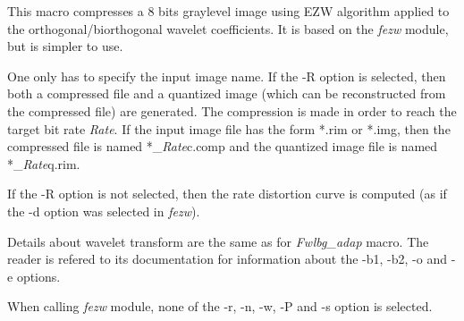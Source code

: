 This macro compresses a 8 bits graylevel image using EZW 
algorithm applied to the orthogonal/biorthogonal wavelet coefficients. 
It is based on the {\em fezw} module, but is simpler to use. 

One only has to specify the input image name. 
If the -R option is selected, then both a compressed file and a quantized 
image (which can be reconstructed from the compressed file) are generated. 
The compression is made in order to reach the target bit rate {\em Rate}. 
If the input image file has the form *.rim or *.img, then 
the compressed file is named *\_{\em Rate}c.comp and the quantized image file 
is named *\_{\em Rate}q.rim.

If the -R option is not selected, then the rate distortion curve is computed 
(as if the -d option was selected in {\em fezw}). 

Details about wavelet transform are the same as for {\em Fwlbg\_adap} macro. 
The reader is refered to its documentation for information about the -b1, -b2, 
-o and -e options. 


When calling {\em fezw} module, none of the -r, -n, -w, -P and -s option is 
selected. 

